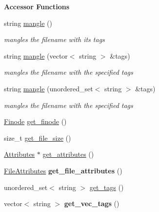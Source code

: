 \begin{Indent}\textbf{ Accessor Functions}\par
\begin{DoxyCompactItemize}
\item 
string \mbox{\hyperlink{classFileInfo_a96827c2e48fb1a15d468e9afd545383e}{mangle}} ()
\begin{DoxyCompactList}\small\item\em mangles the filename with its tags \end{DoxyCompactList}\item 
string \mbox{\hyperlink{classFileInfo_a105ad751f21bead6fc2a76e79cb3b701}{mangle}} (vector$<$ string $>$ \&tags)
\begin{DoxyCompactList}\small\item\em mangles the filename with the specified tags \end{DoxyCompactList}\item 
string \mbox{\hyperlink{classFileInfo_aec8a60addbed54097f6cac0a6a516717}{mangle}} (unordered\+\_\+set$<$ string $>$ \&tags)
\begin{DoxyCompactList}\small\item\em mangles the filename with the specified tags \end{DoxyCompactList}\item 
\mbox{\hyperlink{structfinode}{Finode}} \mbox{\hyperlink{classFileInfo_a706117270bcf31739d7ce0aa0d79891f}{get\+\_\+finode}} ()
\item 
size\+\_\+t \mbox{\hyperlink{classFileInfo_aa07a5b95bfd41814b7fb2ee30a279c65}{get\+\_\+file\+\_\+size}} ()
\item 
\mbox{\hyperlink{classAttributes}{Attributes}} $\ast$ \mbox{\hyperlink{classFileInfo_a07f09582ef3c3beb105906d5c71234a5}{get\+\_\+attributes}} ()
\item 
\mbox{\label{classFileInfo_a0acbb8eead54541137757001474fa689}} 
\mbox{\hyperlink{structfile__attributes}{File\+Attributes}} {\bfseries get\+\_\+file\+\_\+attributes} ()
\item 
unordered\+\_\+set$<$ string $>$ \mbox{\hyperlink{classFileInfo_a63d01334c1c2ae22e5d1930afa5c74d4}{get\+\_\+tags}} ()
\item 
\mbox{\label{classFileInfo_ad66648be9d256ac110cdcf204a3eacc7}} 
vector$<$ string $>$ {\bfseries get\+\_\+vec\+\_\+tags} ()
\end{DoxyCompactItemize}
\end{Indent}
